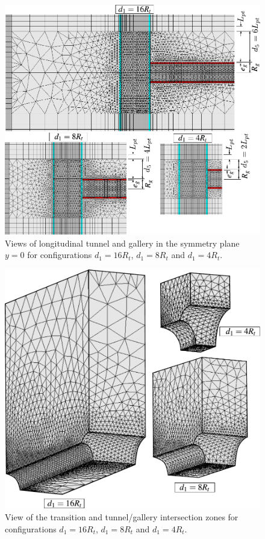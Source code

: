 \documentclass[Journal,letterpaper, NoLists,SectionNumbers]{ascelike-new}
\begin{document}
\begin{figure}[h!]
	\centering
	\includegraphics[scale=0.6]{Mesh4.pdf}
	\caption{Views of longitudinal tunnel and gallery in the symmetry plane $y=0$ for configurations $d_1=16R_t$, $d_1=8R_t$ and $d_1=4R_t$.}
	\label{Mesh4}
\end{figure}
\begin{figure}[h!]
	\centering
	\includegraphics[scale=0.6]{Mesh5.pdf}
	\caption{View of the transition and tunnel/gallery intersection zones for configurations $d_1=16R_t$, $d_1=8R_t$ and $d_1=4R_t$.}
	\label{Mesh5}
\end{figure}
\end{document}
